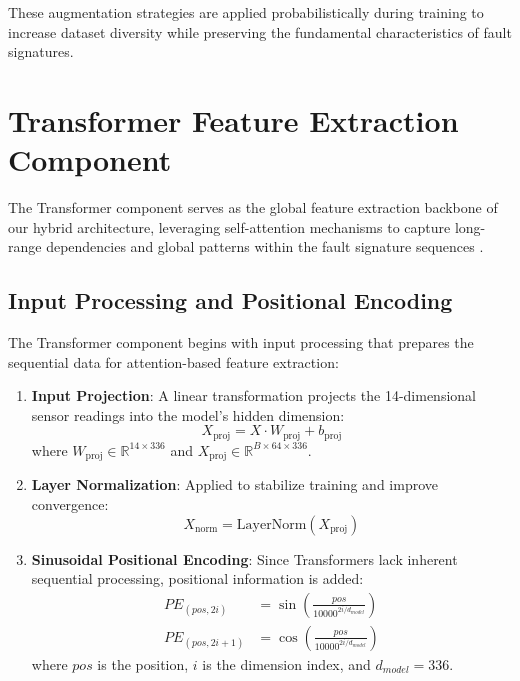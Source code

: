 These augmentation strategies are applied probabilistically during training to increase dataset diversity while preserving the fundamental characteristics of fault signatures.

\section{Transformer Feature Extraction Component}
\label{sec:hybrid_model:transformer_component}

The Transformer component serves as the global feature extraction backbone of our hybrid architecture, leveraging self-attention mechanisms to capture long-range dependencies and global patterns within the fault signature sequences \citep{vaswani2017attention, zhou2021informer}.

\subsection{Input Processing and Positional Encoding}
\label{subsec:input_processing}

The Transformer component begins with input processing that prepares the sequential data for attention-based feature extraction:

\begin{enumerate}
    \item \textbf{Input Projection}: A linear transformation projects the 14-dimensional sensor readings into the model's hidden dimension:
    \begin{equation}
    X_{\text{proj}} = X \cdot W_{\text{proj}} + b_{\text{proj}}
    \end{equation}
    where $W_{\text{proj}} \in \mathbb{R}^{14 \times 336}$ and $X_{\text{proj}} \in \mathbb{R}^{B \times 64 \times 336}$.
    
    \item \textbf{Layer Normalization}: Applied to stabilize training and improve convergence:
    \begin{equation}
    X_{\text{norm}} = \text{LayerNorm}(X_{\text{proj}})
    \end{equation}
    
    \item \textbf{Sinusoidal Positional Encoding}: Since Transformers lack inherent sequential processing, positional information is added:
    \begin{align}
    PE_{(pos, 2i)} &= \sin\left(\frac{pos}{10000^{2i/d_{model}}}\right) \\
    PE_{(pos, 2i+1)} &= \cos\left(\frac{pos}{10000^{2i/d_{model}}}\right)
    \end{align}
    where $pos$ is the position, $i$ is the dimension index, and $d_{model} = 336$.
\end{enumerate}


